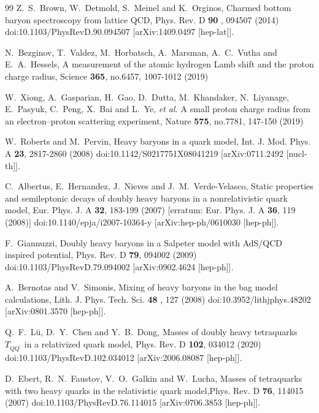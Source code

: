 \documentclass[prd,twocolumn,floatfix,nofootinbib]{revtex4}
\begin{document}
\begin{thebibliography}{99}
 Z.~S.~Brown, W.~Detmold, S.~Meinel and K.~Orginos,
Charmed bottom baryon spectroscopy from lattice QCD, Phys. Rev. D \textbf{90}%
, 094507 (2014) doi:10.1103/PhysRevD.90.094507 [arXiv:1409.0497 [hep-lat]].

 N.~Bezginov, T.~Valdez, M.~Horbatsch, A.~Marsman,
A.~C.~Vutha and E.~A.~Hessels, A measurement of the atomic hydrogen Lamb
shift and the proton charge radius, Science \textbf{365}, no.6457, 1007-1012
(2019)

 W.~Xiong, A.~Gasparian, H.~Gao, D.~Dutta,
M.~Khandaker, N.~Liyanage, E.~Pasyuk, C.~Peng, X.~Bai and L.~Ye, \textit{et
al.} A small proton charge radius from an electron--{}proton scattering
experiment, Nature \textbf{575}, no.7781, 147-150 (2019)

 W.~Roberts and M.~Pervin, Heavy baryons in a quark
model, Int. J. Mod. Phys. A \textbf{23}, 2817-2860 (2008)
doi:10.1142/S0217751X08041219 [arXiv:0711.2492 [nucl-th]].

 C.~Albertus, E.~Hernandez, J.~Nieves and
J.~M.~Verde-Velasco, Static properties and semileptonic decays of doubly
heavy baryons in a nonrelativistic quark model, Eur. Phys. J. A \textbf{32},
183-199 (2007) [erratum: Eur. Phys. J. A \textbf{36}, 119 (2008)]
doi:10.1140/epja/i2007-10364-y [arXiv:hep-ph/0610030 [hep-ph]].

 F.~Giannuzzi, Doubly heavy baryons in a Salpeter
model with AdS/QCD inspired potential, Phys. Rev. D \textbf{79}, 094002
(2009) doi:10.1103/PhysRevD.79.094002 [arXiv:0902.4624 [hep-ph]].

 A.~Bernotas and V.~Simonis, Mixing of heavy
baryons in the bag model calculations, Lith. J. Phys. Tech. Sci. \textbf{48}%
, 127 (2008) doi:10.3952/lithjphys.48202 [arXiv:0801.3570 [hep-ph]].

 Q.~F.~L\"u, D.~Y.~Chen and Y.~B.~Dong, Masses of doubly
heavy tetraquarks $T_{QQ^\prime}$ in a relativized quark model, Phys. Rev. D
\textbf{102}, 034012 (2020) doi:10.1103/PhysRevD.102.034012
[arXiv:2006.08087 [hep-ph]].

 D.~Ebert, R.~N.~Faustov, V.~O.~Galkin and W.~Lucha,
Masses of tetraquarks with two heavy quarks in the relativistic quark
model,Phys. Rev. D \textbf{76}, 114015 (2007) doi:10.1103/PhysRevD.76.114015
[arXiv:0706.3853 [hep-ph]].



\end{thebibliography}
\end{document}
